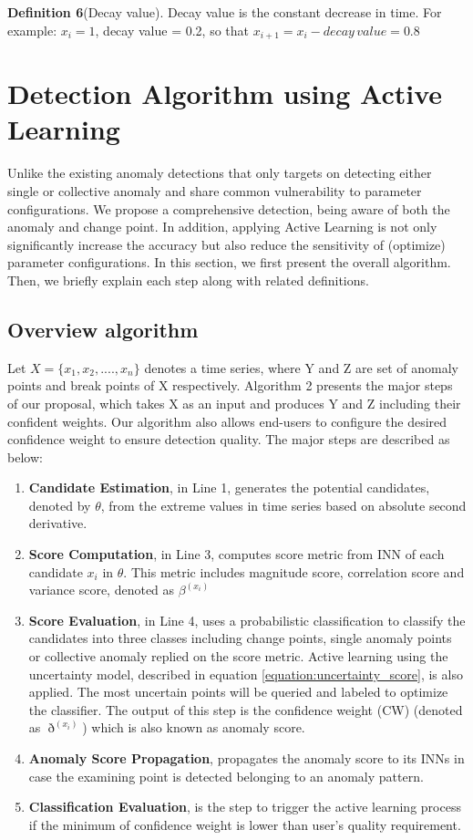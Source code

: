\textbf{Definition 6}(Decay value). Decay value is the constant decrease in time. For example: $ x_i = 1 $, decay value = 0.2, so that $ x_{i+1} = x_i - decay \, value = 0.8 $

\section{Detection Algorithm using Active Learning}

Unlike the existing anomaly detections that only targets on detecting either single or collective anomaly and share common vulnerability to parameter configurations. We propose a comprehensive detection, being aware of both the anomaly and change point. In addition, applying Active Learning is not only significantly increase the accuracy but also reduce the sensitivity of (optimize) parameter configurations. In this section, we first present the overall algorithm. Then, we briefly explain each step along with related definitions.

\subsection{Overview algorithm}
Let $ X = \{x_1, x_2, ...., x_n \} $ denotes a time series, where Y and Z are set of anomaly points and break points of X respectively. Algorithm 2 presents the major steps of our proposal, which takes X as an input and produces Y and Z including their confident weights. Our algorithm also allows end-users to configure the desired confidence weight to ensure detection quality. The major steps are described as below:
\begin{enumerate}
	\item \textbf{Candidate Estimation}, in Line 1, generates the potential candidates, denoted by $ \theta $, from the extreme values in time series based on absolute second derivative.  
	\item \textbf{Score Computation}, in Line 3, computes score metric from INN of each candidate $ x_i $ in $ \theta $. This metric includes magnitude score, correlation score and variance score, denoted as $ \beta^{(x_i)} $
	\item \textbf{Score Evaluation}, in Line 4, uses a probabilistic classification to classify the candidates into three classes including change points, single anomaly points  or collective anomaly replied on the score metric. Active learning using the uncertainty model, described in equation \ref{equation:uncertainty_score}, is also applied. The most uncertain points will be queried and labeled to optimize the classifier. The output of this step is the confidence weight (CW) (denoted as $ \eth^{(x_i)} $) which is also known as anomaly score.
	\item \textbf{Anomaly Score Propagation}, propagates the anomaly score to its INNs in case the examining point is detected belonging to an anomaly pattern.
	\item \textbf{Classification Evaluation}, is the step to trigger the active learning process if the minimum of confidence weight is lower than user's quality requirement.

\end{enumerate}


